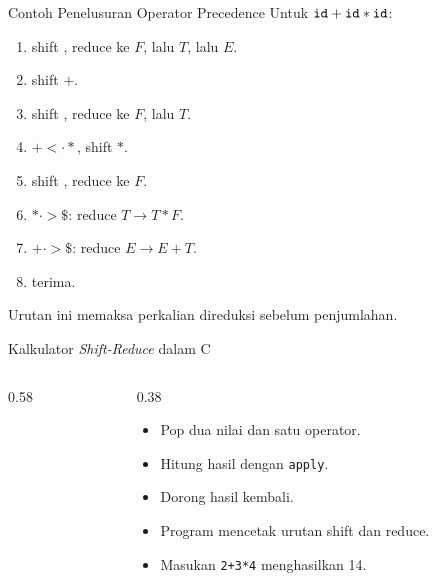\documentclass[aspectratio=169,10pt,t]{beamer}
\begin{document}
\begin{frame}{Contoh Penelusuran Operator Precedence}
  \small
  Untuk \(\texttt{id}+\texttt{id}*\texttt{id}\):
  \begin{enumerate}
    \setlength{\itemsep}{1pt}
    \item shift , reduce ke \(F\), lalu \(T\), lalu \(E\).
    \item shift \(+\).
    \item shift , reduce ke \(F\), lalu \(T\).
    \item \(+ <\cdot *\), shift \(*\).
    \item shift , reduce ke \(F\).
    \item \(* \cdot> \$\): reduce \(T \to T*F\).
    \item \(+ \cdot> \$\): reduce \(E \to E+T\).
    \item terima.
  \end{enumerate}

  \vspace{3pt}
  {\footnotesize\color{ubbblue!80}Urutan ini memaksa perkalian
  direduksi sebelum penjumlahan.}
\end{frame}

\begin{frame}[fragile]{Kalkulator \textit{Shift-Reduce} dalam C}
  \begin{columns}[T,onlytextwidth]
    \begin{column}{0.58\textwidth}
      
    \end{column}
    \begin{column}{0.38\textwidth}
      \begin{itemize}
        \item Pop dua nilai dan satu operator.
        \item Hitung hasil dengan \texttt{apply}.
        \item Dorong hasil kembali.
        \item Program mencetak urutan shift dan reduce.
        \item Masukan \texttt{2+3*4} menghasilkan 14.
      \end{itemize}
    \end{column}
  \end{columns}
\end{frame}
\end{document}

